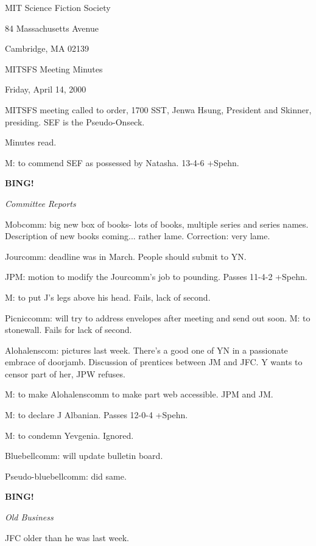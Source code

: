 \documentclass[12pt]{article}
\newcommand{\bing}{{\bf BING!} }
\newcommand{\goto}[1]{\bing \vskip 12pt \centerline{{\em{#1}}}}
\begin{document}
\begin{center}

MIT Science Fiction Society 

84 Massachusetts Avenue

Cambridge, MA 02139

\vspace{12pt}

MITSFS Meeting Minutes 

Friday, April 14, 2000

\end{center}
 
\vspace{18pt}

\setlength{\parskip}{6pt}

\noindent
MITSFS meeting called to order, 1700 SST, Jenwa Hsung, President and
Skinner, presiding. SEF is the Pseudo-Onseck.

Minutes read.

M: to commend SEF as possessed by Natasha. 13-4-6 +Spehn.

\goto{Committee Reports}

Mobcomm: big new box of books- lots of books, multiple series and series names. Description of new books coming... rather lame. Correction: very lame.

Jourcomm: deadline was in March. People should submit to YN.

JPM: motion to modify the Jourcomm's job to pounding. Passes 11-4-2 +Spehn.

M: to put J's legs above his head. Fails, lack of second.

Picniccomm: will try to address envelopes after meeting and send out soon. M: to stonewall. Fails for lack of second.

Alohalenscom: pictures last week. There's a good one of YN in a passionate embrace of doorjamb. Discussion of prentices between JM and JFC. Y wants to censor part of her, JPW refuses.

M: to make Alohalenscomm to make part web accessible. JPM and JM.

M: to declare J Albanian. Passes 12-0-4 +Spehn.

M: to condemn Yevgenia. Ignored.

Bluebellcomm: will update bulletin board.

Pseudo-bluebellcomm: did same.

\goto{Old Business}

JFC older than he was last week.
\end{document}
